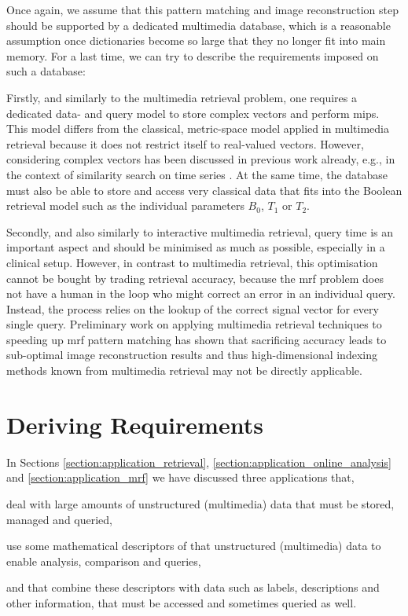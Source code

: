 Once again, we assume that this pattern matching and image reconstruction step should be supported by a dedicated multimedia database, which is a reasonable assumption once dictionaries become so large that they no longer fit into main memory. For a last time, we can try to describe the requirements imposed on such a database: 

Firstly, and similarly to the multimedia retrieval problem, one requires a dedicated data- and query model to store complex vectors and perform \acrshort{mips}. This model differs from the classical, metric-space model applied in multimedia retrieval because it does not restrict itself to real-valued vectors. However, considering complex vectors has been discussed in previous work already, e.g., in the context of similarity search on time series \cite{Rafiei:1997Similarity}. At the same time, the database must also be able to store and access very classical data that fits into the Boolean retrieval model such as the individual parameters $B_0$, $T_1$ or $T_2$. 

Secondly, and also similarly to interactive multimedia retrieval, query time is an important aspect and should be minimised as much as possible, especially in a clinical setup. However, in contrast to multimedia retrieval, this optimisation cannot be bought by trading retrieval accuracy, because the \acrshort{mrf} problem does not have a human in the loop who might correct an error in an individual query. Instead, the process relies on the lookup of the correct signal vector for every single query. Preliminary work on applying multimedia retrieval techniques to speeding up \acrshort{mrf} pattern matching has shown that sacrificing accuracy leads to sub-optimal image reconstruction results \cite{Huerbin:2020Retrieval,Zihlmann:2021Magnetic} and thus high-dimensional indexing methods known from multimedia retrieval may not be directly applicable.

\section{Deriving Requirements}
In Sections \ref{section:application_retrieval}, \ref{section:application_online_analysis} and \ref{section:application_mrf} we have discussed three applications that, 
\begin{enumerate*}[label=(\roman*)]
    \item deal with large amounts of unstructured (multimedia) data that must be stored, managed and queried,
    \item use some mathematical descriptors of that unstructured (multimedia) data to enable analysis, comparison and queries,
    \item and that combine these descriptors with data such as labels, descriptions and other information, that must be accessed and sometimes queried as well.
\end{enumerate*}

